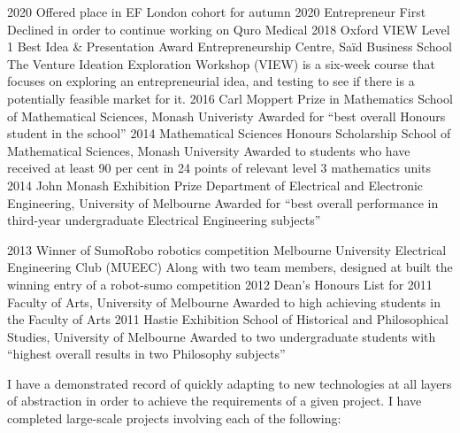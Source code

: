 \documentclass[9pt]{developercv} %
\begin{document}
\begin{entrylist}
  \entry
    {2020}
    {Offered place in EF London cohort for autumn 2020}
    {Entrepreneur First}
    {Declined in order to continue working on Quro Medical}
  \entry
    {2018}
    {Oxford VIEW Level 1 Best Idea \& Presentation Award}
    {Entrepreneurship Centre, Sa\"id Business School}
    {The Venture Ideation Exploration Workshop (VIEW) is a six-week course that focuses on exploring an entrepreneurial idea, and testing to see if there is a potentially feasible market for it.}
  \entry
    {2016}
    {Carl Moppert Prize in Mathematics}
    {School of Mathematical Sciences, Monash Univeristy}
    {Awarded for ``best overall Honours student in the school''}
  \entry
    {2014}
    {Mathematical Sciences Honours Scholarship}
    {School of Mathematical Sciences, Monash University}
    {Awarded to students who have received at least 90 per cent in 24 points of relevant level 3 mathematics units}
  \entry
    {2014}
    {John Monash Exhibition Prize}
    {Department of Electrical and Electronic Engineering, University of Melbourne}
    {Awarded for ``best overall performance in third-year undergraduate Electrical Engineering subjects''}

  \entry
    {2013}
    {Winner of SumoRobo robotics competition}
    {Melbourne University Electrical Engineering Club (MUEEC)}
    {Along with two team members, designed at built the winning entry of a robot-sumo competition}
  \entry
    {2012}
    {Dean's Honours List for 2011}
    {Faculty of Arts, University of Melbourne}
    {Awarded to high achieving students in the Faculty of Arts}
  \entry
    {2011}
    {Hastie Exhibition}
    {School of Historical and Philosophical Studies, University of Melbourne}
    {Awarded to two undergraduate students with ``highest overall results in two Philosophy subjects''}
\end{entrylist}


I have a demonstrated record of quickly adapting to new technologies at all layers of abstraction in order to achieve the requirements of a given project.
I have completed large-scale projects involving each of the following:

\vspace{.25cm}
\end{document}
